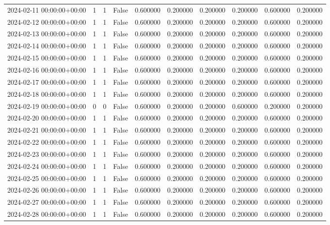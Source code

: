 \begin{tabular}{lrrrrrrrrr}
2024-02-11 00:00:00+00:00 & 1 & 1 & False & 0.600000 & 0.200000 & 0.200000 & 0.200000 & 0.600000 & 0.200000 \\
2024-02-12 00:00:00+00:00 & 1 & 1 & False & 0.600000 & 0.200000 & 0.200000 & 0.200000 & 0.600000 & 0.200000 \\
2024-02-13 00:00:00+00:00 & 1 & 1 & False & 0.600000 & 0.200000 & 0.200000 & 0.200000 & 0.600000 & 0.200000 \\
2024-02-14 00:00:00+00:00 & 1 & 1 & False & 0.600000 & 0.200000 & 0.200000 & 0.200000 & 0.600000 & 0.200000 \\
2024-02-15 00:00:00+00:00 & 1 & 1 & False & 0.600000 & 0.200000 & 0.200000 & 0.200000 & 0.600000 & 0.200000 \\
2024-02-16 00:00:00+00:00 & 1 & 1 & False & 0.600000 & 0.200000 & 0.200000 & 0.200000 & 0.600000 & 0.200000 \\
2024-02-17 00:00:00+00:00 & 1 & 1 & False & 0.600000 & 0.200000 & 0.200000 & 0.200000 & 0.600000 & 0.200000 \\
2024-02-18 00:00:00+00:00 & 1 & 1 & False & 0.600000 & 0.200000 & 0.200000 & 0.200000 & 0.600000 & 0.200000 \\
2024-02-19 00:00:00+00:00 & 0 & 0 & False & 0.600000 & 0.200000 & 0.200000 & 0.600000 & 0.200000 & 0.200000 \\
2024-02-20 00:00:00+00:00 & 1 & 1 & False & 0.600000 & 0.200000 & 0.200000 & 0.200000 & 0.600000 & 0.200000 \\
2024-02-21 00:00:00+00:00 & 1 & 1 & False & 0.600000 & 0.200000 & 0.200000 & 0.200000 & 0.600000 & 0.200000 \\
2024-02-22 00:00:00+00:00 & 1 & 1 & False & 0.600000 & 0.200000 & 0.200000 & 0.200000 & 0.600000 & 0.200000 \\
2024-02-23 00:00:00+00:00 & 1 & 1 & False & 0.600000 & 0.200000 & 0.200000 & 0.200000 & 0.600000 & 0.200000 \\
2024-02-24 00:00:00+00:00 & 1 & 1 & False & 0.600000 & 0.200000 & 0.200000 & 0.200000 & 0.600000 & 0.200000 \\
2024-02-25 00:00:00+00:00 & 1 & 1 & False & 0.600000 & 0.200000 & 0.200000 & 0.200000 & 0.600000 & 0.200000 \\
2024-02-26 00:00:00+00:00 & 1 & 1 & False & 0.600000 & 0.200000 & 0.200000 & 0.200000 & 0.600000 & 0.200000 \\
2024-02-27 00:00:00+00:00 & 1 & 1 & False & 0.600000 & 0.200000 & 0.200000 & 0.200000 & 0.600000 & 0.200000 \\
2024-02-28 00:00:00+00:00 & 1 & 1 & False & 0.600000 & 0.200000 & 0.200000 & 0.200000 & 0.600000 & 0.200000 \\

\end{tabular}
